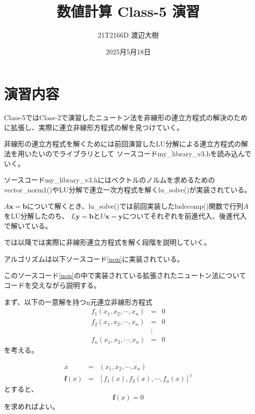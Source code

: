 \documentclass[a4paper,11pt]{jsarticle}
\begin{document}

\title{数値計算 Class-5 演習}
\author{21T2166D 渡辺大樹}
\date{2025月5月18日}
\maketitle

\section{演習内容}
Class-5ではClass-2で演習したニュートン法を非線形の連立方程式の解決のために拡張し、実際に連立非線形方程式の解を見つけていく。

非線形の連立方程式を解くためには前回演習したLU分解による連立方程式の解法を用いたいのでライブラリとして
ソースコードmy\_library\_v3.hを読み込んでいく。

ソースコードmy\_library\_v3.hにはベクトルのノルムを求めるためのvector\_norm1()やLU分解で連立一次方程式を解くlu\_solve()が実装されている。

$A\textbf{x}=\textbf{b}$について解くとき、lu\_solve()では前回実装したludecomp()関数で行列$A$をLU分解したのち、
$L\textbf{y}=\textbf{b}$と$U\textbf{x}=\textbf{y}$についてそれぞれを前進代入、後進代入で解いている。

では以降では実際に非線形連立方程式を解く段階を説明していく。

アルゴリズムは以下ソースコード\ref{non}に実装されている。


\newpage
このソースコード\ref{non}の中で実装されている拡張されたニュートン法についてコードを交えながら説明する。

まず、以下の一意解を持つn元連立非線形方程式
\begin{displaymath}
    \begin{array}{lll}
        f_1(x_1,x_2,\cdots,x_n) & =      & 0 \\
        f_2(x_1,x_2,\cdots,x_n) & =      & 0 \\
                                & \vdots &   \\
        f_n(x_1,x_2,\cdots,x_n) & =      & 0
    \end{array}
\end{displaymath}
を考える。

\begin{displaymath}
    \begin{array}{lll}
        x             & = & (x_1,x_2,\cdots,x_n)               \\
        \textbf{f}(x) & = & [f_1(x), f_2(x), \cdots, f_n(x)]^t
    \end{array}
\end{displaymath}
とすると、
\begin{displaymath}
    \textbf{f}(x) = 0
\end{displaymath}
を求めればよい。
\end{document}

